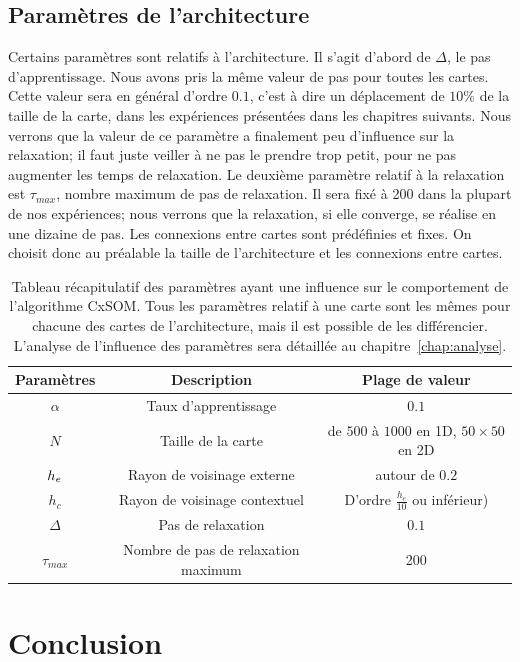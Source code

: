 \subsection{Paramètres de l'architecture}
Certains paramètres sont relatifs à l'architecture. Il s'agit d'abord de $\Delta$, le pas d'apprentissage. Nous avons pris la même valeur de pas pour toutes les cartes. Cette valeur sera en général d'ordre $0.1$, c'est à dire un déplacement de $10\%$ de la taille de la carte, dans les expériences présentées dans les chapitres suivants. Nous verrons que la valeur de ce paramètre a finalement peu d'influence sur la relaxation; il faut juste veiller à ne pas le prendre trop petit, pour ne pas augmenter les temps de relaxation. Le deuxième paramètre relatif à la relaxation est $\tau_{max}$, nombre maximum de pas de relaxation. Il sera fixé à 200 dans la plupart de nos expériences; nous verrons que la relaxation, si elle converge, se réalise en une dizaine de pas.
Les connexions entre cartes sont prédéfinies et fixes. On choisit donc au préalable la taille de l'architecture et les connexions entre cartes.

\begin{table}
\caption{Tableau récapitulatif des paramètres ayant une influence sur le comportement de l'algorithme CxSOM. Tous les paramètres relatif à une carte sont les mêmes pour chacune des cartes de l'architecture, mais il est possible de les différencier. L'analyse de l'influence des paramètres sera détaillée au chapitre~\ref{chap:analyse}.}\label{tab:params}
\vspace{3mm}
\begin{tabular}{|c|c|c|}
\hline
Paramètres & Description & Plage de valeur \\
\hline
$\alpha$ & Taux d'apprentissage & $0.1$ \\
$N$ & Taille de la carte & de $500$ à $1000$ en 1D, $50 \times 50$ en 2D \\
$h_e$ & Rayon de voisinage externe & autour de $0.2$ \\
$h_c$ & Rayon de voisinage contextuel & D'ordre $\frac{h_e}{10}$ ou inférieur) \\
$\Delta$ & Pas de relaxation & $0.1$ \\
$\tau_{max}$ & Nombre de pas de relaxation maximum & 200 \\
\hline
\end{tabular}
\end{table}


\section{Conclusion}

